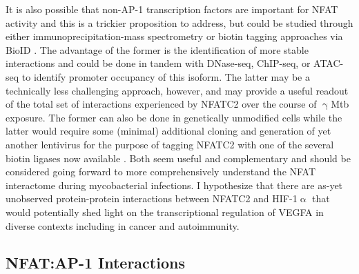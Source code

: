 It is also possible that non\hyp{}AP\hyp{}1 transcription factors are important for NFAT activity and this is a trickier proposition to address, but could be studied through either immunoprecipitation\hyp{}mass spectrometry or biotin tagging approaches via BioID \citep{Roux2012}. The advantage of the former is the identification of more stable interactions and could be done in tandem with DNase\hyp{}seq, ChIP\hyp{}seq, or ATAC\hyp{}seq to identify promoter occupancy of this isoform. The latter may be a technically less challenging approach, however, and may provide a useful readout of the total set of interactions experienced by NFATC2 over the course of $\upgamma$Mtb exposure. The former can also be done in genetically unmodified cells while the latter would require some (minimal) additional cloning and generation of yet another lentivirus for the purpose of tagging NFATC2 with one of the several biotin ligases now available \citep{Cho2020}. Both seem useful and complementary and should be considered going forward to more comprehensively understand the NFAT interactome during mycobacterial infections. I hypothesize that there are as\hyp{}yet unobserved protein\hyp{}protein interactions between NFATC2 and HIF\hyp{}1$\upalpha$ that would potentially shed light on the transcriptional regulation of VEGFA in diverse contexts including in cancer and autoimmunity. 

\subsection{NFAT:AP\hyp{}1 Interactions}\label{nfatap1}

